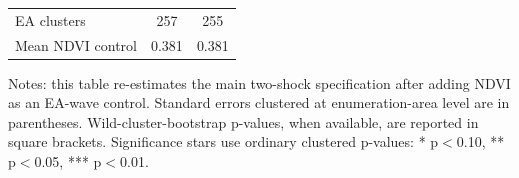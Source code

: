 \begin{table}[!htbp]
\begin{tabular}{lcc}
EA clusters & 257 & 255 \\
Mean NDVI control & 0.381 & 0.381 \\
\bottomrule
\end{tabular}
\begin{minipage}{0.96\textwidth}\vspace{0.3em}\footnotesize Notes: this table re-estimates the main two-shock specification after adding NDVI as an EA-wave control. Standard errors clustered at enumeration-area level are in parentheses. Wild-cluster-bootstrap p-values, when available, are reported in square brackets. Significance stars use ordinary clustered p-values: * p$<$0.10, ** p$<$0.05, *** p$<$0.01. \end{minipage}
\end{table}
